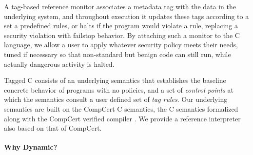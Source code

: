 \documentclass{llncs}
\begin{document}

A tag-based reference monitor associates a metadata tag with the data in the underlying system,
and throughout execution it updates these tags according to a set a predefined rules, or halts if
the program would violate a rule, replacing a security violation with failstop behavior. By attaching
such a monitor to the C language, we allow a user to apply whatever security policy meets their needs,
tuned if necessary so that non-standard but benign code can still run, while actually dangerous activity
is halted.


Tagged C consists of an underlying semantics that establishes the baseline concrete behavior of programs
with no policies, and a set of {\em control points} at which the semantics consult a user defined set of
{\em tag rules}. Our underlying semantics are built on the CompCert C semantics, the C semantics formalized
along with the CompCert verified compiler \cite{Leroy09:CompCert}. We provide a reference interpreter
also based on that of CompCert.

\paragraph*{Why Dynamic?}
  
\end{document}
